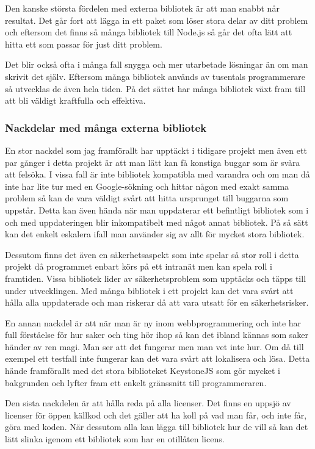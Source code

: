 Den kanske största fördelen med externa bibliotek är att man snabbt når resultat. Det går fort att lägga in ett paket som löser stora delar av ditt problem och eftersom det finns så många bibliotek till Node.js så går det ofta lätt att hitta ett som passar för just ditt problem.

Det blir också ofta i många fall snygga och mer utarbetade lösningar än om man skrivit det själv. Eftersom många bibliotek används av tusentals programmerare så utvecklas de även hela tiden. På det sättet har många bibliotek växt fram till att bli väldigt kraftfulla och effektiva. 

\subsubsection{Nackdelar med många externa bibliotek}

En stor nackdel som jag framförallt har upptäckt i tidigare projekt men även ett par gånger i detta projekt är att man lätt kan få konstiga buggar som är svåra att felsöka. I vissa fall är inte bibliotek kompatibla med varandra och om man då inte har lite tur med en Google-sökning och hittar någon med exakt samma problem så kan de vara väldigt svårt att hitta ursprunget till buggarna som uppstår. Detta kan även hända när man uppdaterar ett befintligt bibliotek som i och med uppdateringen blir inkompatibelt med något annat bibliotek. På så sätt kan det enkelt eskalera ifall man använder sig av allt för mycket stora bibliotek.

Dessutom finns det även en säkerhetsaspekt som inte spelar så stor roll i detta projekt då programmet enbart körs på ett intranät men kan spela roll i framtiden. Vissa bibliotek lider av säkerhetsproblem som upptäcks och täpps till under utvecklingen. Med många bibliotek i ett projekt kan det vara svårt att hålla alla uppdaterade och man riskerar då att vara utsatt för en säkerhetsrisker.

En annan nackdel är att när man är ny inom webbprogrammering och inte har full förståelse för hur saker och ting hör ihop så kan det ibland kännas som saker händer av ren magi. Man ser att det fungerar men man vet inte hur. Om då till exempel ett testfall inte fungerar kan det vara svårt att lokalisera och lösa. Detta hände framförallt med det stora biblioteket KeystoneJS som gör mycket i bakgrunden och lyfter fram ett enkelt gränssnitt till programmeraren.

Den sista nackdelen är att hålla reda på alla licenser. Det finns en uppsjö av licenser för öppen källkod och det gäller att ha koll på vad man får, och inte får, göra med koden. När dessutom alla kan lägga till bibliotek hur de vill så kan det lätt slinka igenom ett bibliotek som har en otillåten licens.


